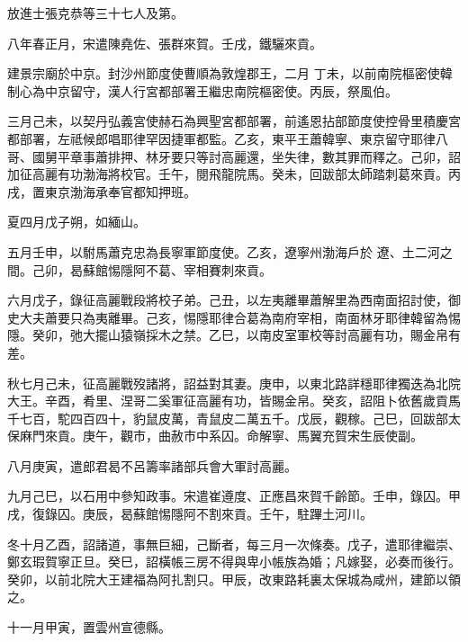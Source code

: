 \begin{pinyinscope}
 放進士張克恭等三十七人及第。



 八年春正月，宋遣陳堯佐、張群來賀。壬戌，鐵驪來貢。



 建景宗廟於中京。封沙州節度使曹順為敦煌郡王，二月
 丁未，以前南院樞密使韓制心為中京留守，漢人行宮都部署王繼忠南院樞密使。丙辰，祭風伯。



 三月己未，以契丹弘義宮使赫石為興聖宮都部署，前遙恩拈部節度使控骨里積慶宮都部署，左祗候郎唱耶律罕因捷軍都監。乙亥，東平王蕭韓寧、東京留守耶律八哥、國舅平章事蕭排押、林牙要只等討高麗還，坐失律，數其罪而釋之。己卯，詔加征高麗有功渤海將校官。壬午，閱飛龍院馬。癸未，回跋部太師踏刺葛來貢。丙戌，置東京渤海承奉官都知押班。



 夏四月戊子朔，如緬山。



 五月壬申，以駙馬蕭克忠為長寧軍節度使。乙亥，遼寧州渤海戶於
 遼、土二河之間。己卯，曷蘇館惕隱阿不葛、宰相賽刺來貢。



 六月戊子，錄征高麗戰段將校子弟。己丑，以左夷離畢蕭解里為西南面招討使，御史大夫蕭要只為夷離畢。己亥，惕隱耶律合葛為南府宰相，南面林牙耶律韓留為惕隱。癸卯，弛大擺山猿嶺採木之禁。乙巳，以南皮室軍校等討高麗有功，賜金帛有差。



 秋七月己未，征高麗戰歿諸將，詔益對其妻。庚申，以東北路詳穩耶律獨迭為北院大王。辛酉，肴里、涅哥二奚軍征高麗有功，皆賜金帛。癸亥，詔阻卜依舊歲貢馬千七百，駝四百四十，豹鼠皮萬，青鼠皮二萬五千。戊辰，觀稼。己巳，回跋部太
 保麻門來貢。庚午，觀市，曲赦市中系囚。命解寧、馬翼充賀宋生辰使副。



 八月庚寅，遣郎君曷不呂籌率諸部兵會大軍討高麗。



 九月己巳，以石用中參知政事。宋遣崔遵度、正應昌來賀千齡節。壬申，錄囚。甲戌，復錄囚。庚辰，曷蘇館惕隱阿不割來貢。壬午，駐蹕土河川。



 冬十月乙酉，詔諸道，事無巨細，己斷者，每三月一次條奏。戊子，遣耶律繼崇、鄭玄瑕賀寧正旦。癸巳，詔橫帳三房不得與卑小帳族為婚；凡嫁娶，必奏而後行。癸卯，以前北院大王建福為阿扎割只。甲辰，改東路耗裏太保城為咸州，建節以領之。



 十一月甲寅，置雲州宣德縣。




\end{pinyinscope}
